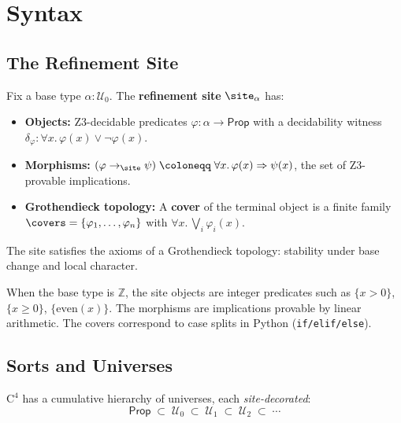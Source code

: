 \section{Syntax}
\label{sec:syntax}

\subsection{The Refinement Site}

\begin{definition}
\label{def:refinement-site}
Fix a base type \(\alpha : \mathcal{U}_0\).  The
\textbf{refinement site} \(\site_\alpha\) has:
\begin{itemize}
\item \textbf{Objects:}  Z3-decidable predicates
  \(\varphi : \alpha \to \mathsf{Prop}\) with a decidability witness
  \(\delta_\varphi : \forall x.\, \varphi(x) \vee \neg\varphi(x)\).
\item \textbf{Morphisms:}
  \((\varphi \to_{\site} \psi) \;\coloneqq\;
  \forall x.\, \varphi(x) \Rightarrow \psi(x)\),
  the set of Z3-provable implications.
\item \textbf{Grothendieck topology:}  A \textbf{cover} of the
  terminal object is a finite family
  \(\covers = \{\varphi_1, \ldots, \varphi_n\}\) with
  \(\forall x.\,\bigvee_i \varphi_i(x)\).
\end{itemize}
The site satisfies the axioms of a Grothendieck topology:
stability under base change and local character.
\end{definition}

\begin{remark}
When the base type is \(\mathbb{Z}\), the site objects are integer
predicates such as \(\{x > 0\}\), \(\{x \geq 0\}\),
\(\{\text{even}(x)\}\).  The morphisms are implications provable
by linear arithmetic.  The covers correspond to case splits in Python
(\texttt{if/elif/else}).
\end{remark}

\subsection{Sorts and Universes}

\(\mathrm{C}^4\) has a cumulative hierarchy of universes, each
\emph{site-decorated}:
\[
  \mathsf{Prop} \;\subset\; \mathcal{U}_0 \;\subset\;
  \mathcal{U}_1 \;\subset\; \mathcal{U}_2 \;\subset\; \cdots
\]

